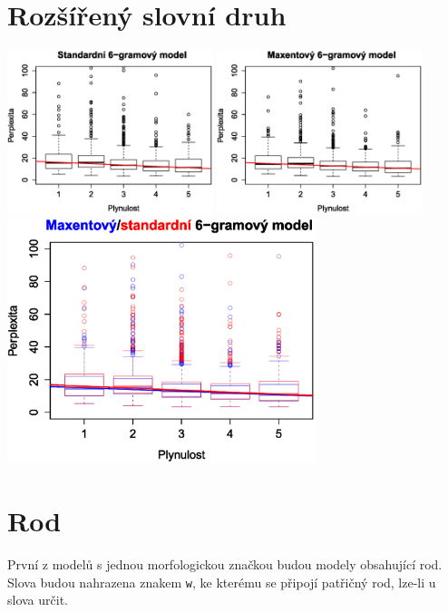 \documentclass[12pt,a4paper]{report}
\begin{document}
\section{Rozšířený slovní druh}
\begin{center}
	\includegraphics[width=60mm]{./grafy/morf/ngram/rsd.svg.eps}
	\includegraphics[width=60mm]{./grafy/morf/maxent/rsd.svg.eps}
	\includegraphics[width=90mm]{./grafy/morf/porovnani/rsd.svg.eps}	
\end{center}

\section{Rod}
První z modelů s jednou morfologickou značkou budou modely obsahující rod. Slova budou nahrazena znakem \texttt{w}, ke kterému se připojí patřičný rod, lze-li u slova určit.
\end{document}

